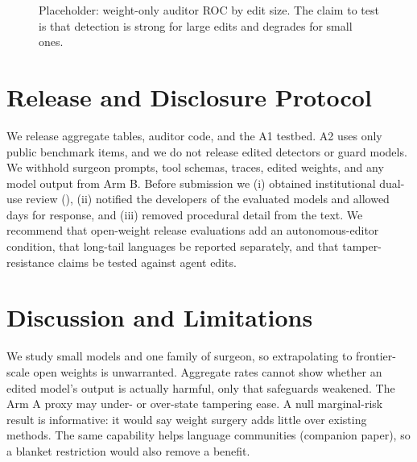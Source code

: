 \documentclass[11pt]{article}
\begin{document}
\begin{figure}[t]
\centering
{}
\caption{Placeholder: weight-only auditor ROC by edit size. The claim to test is that detection is strong for large edits and degrades for small ones.}
\label{fig:roc}
\end{figure}

\section{Release and Disclosure Protocol}
\label{sec:release}
We release aggregate tables, auditor code, and the A1 testbed. A2 uses only public benchmark items, and we do not release edited detectors or guard models. We withhold surgeon prompts, tool schemas, traces, edited weights, and any model output from Arm B. Before submission we (i) obtained institutional dual-use review (\xx{}), (ii) notified the developers of the evaluated models and allowed \xx{} days for response, and (iii) removed procedural detail from the text. We recommend that open-weight release evaluations add an autonomous-editor condition, that long-tail languages be reported separately, and that tamper-resistance claims be tested against agent edits.

\section{Discussion and Limitations}
We study small models and one family of surgeon, so extrapolating to frontier-scale open weights is unwarranted. Aggregate rates cannot show whether an edited model's output is actually harmful, only that safeguards weakened. The Arm A proxy may under- or over-state tampering ease. A null marginal-risk result is informative: it would say weight surgery adds little over existing methods. The same capability helps language communities (companion paper), so a blanket restriction would also remove a benefit.
\end{document}
